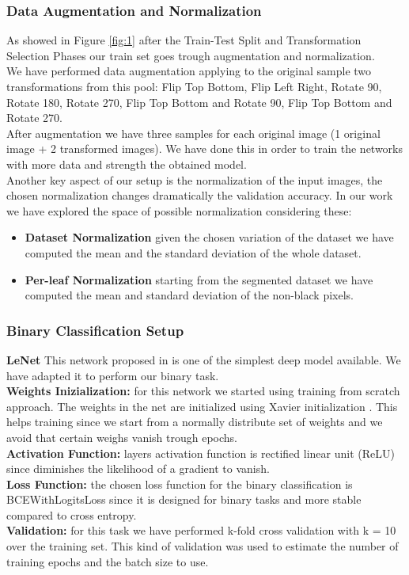 \subsubsection{Data Augmentation and Normalization}
As showed in Figure \ref{fig:1} after the Train-Test Split and Transformation Selection Phases our train set goes trough augmentation and normalization.
\\\indent We have performed data augmentation applying to the original sample two transformations from this pool:
Flip Top Bottom, 	Flip Left Right, Rotate 90\degree, Rotate 180\degree, Rotate 270\degree, Flip Top Bottom and Rotate 90\degree, Flip Top Bottom and Rotate 270\degree.
\\\indent After augmentation we have three samples for each original image (1 original image + 2 transformed images).
We have done this in order to train the networks with more data and strength the obtained model.
\\\indent Another key aspect of our setup is the normalization of the input images, the chosen normalization changes dramatically the validation accuracy. In our work we have explored the space of possible normalization considering these:
	\begin{itemize}
		\item{\textbf{Dataset Normalization} given the chosen variation of the dataset we have computed the mean and the standard deviation of the whole dataset.}
		\item{\textbf{Per-leaf Normalization} starting from the segmented dataset we have computed the mean and standard deviation of the non-black pixels.}
	\end{itemize}
\subsubsection{Binary Classification Setup}

\textbf{LeNet}
This network proposed in \cite{ref30} is one of the simplest deep model available. We have adapted it to perform our binary task. \\
\textbf{Weights Inizialization:}
for this network we started using training from scratch approach. The weights in the net are initialized using Xavier initialization \cite{ref31}. This helps training  since we start from a normally distribute set of weights and we avoid that certain weighs vanish trough epochs.
\\
\textbf{Activation Function:}
layers activation function is rectified linear unit (ReLU) since diminishes the likelihood of a gradient to vanish.
\\
\textbf{Loss Function:}
the chosen loss function for the binary classification is BCEWithLogitsLoss since it is designed for binary tasks and more stable compared to cross entropy.
\\
\textbf{Validation:}
for this task we have performed k-fold cross validation with k = 10 over the training set. This kind of validation was used to estimate the number of training epochs and the batch size to use.
